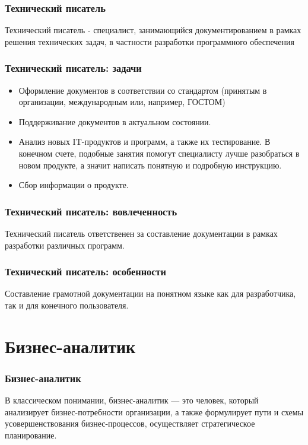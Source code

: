 \documentclass{../industrial-development}
\begin{document}
	\begin{frame} \frametitle{Технический писатель}
		\begin{block}{}
			\alert {Технический писатель} - специалист, занимающийся документированием в рамках решения технических задач, в частности разработки программного обеспечения
		\end{block}
	\end{frame}
	
	\begin{frame} \frametitle{Технический писатель: задачи}
		\begin{itemize}
			\item Оформление документов в соответствии со стандартом (принятым в организации, международным или, например, ГОСТОМ)
			\item Поддерживание документов в актуальном состоянии.
			\item Анализ новых IT-продуктов и программ, а также их тестирование. В конечном счете, подобные занятия помогут специалисту лучше разобраться в новом продукте, а значит написать понятную и подробную инструкцию.
			\item Сбор информации о продукте.
		\end{itemize}
	\end{frame}
	\begin{frame} \frametitle{Технический писатель: вовлеченность}
		Технический писатель ответственен за составление документации в рамках разработки различных программ.
	\end{frame}
	
	\begin{frame} \frametitle{Технический писатель: особенности}
		Составление грамотной документации на понятном языке как для разработчика, так и для конечного пользователя.
	\end{frame}
	
	\section{Бизнес-аналитик}
	
	\begin{frame} \frametitle{Бизнес-аналитик}
		\begin{block}{}
			\alert {}В классическом понимании, {бизнес-аналитик} — это человек, который анализирует бизнес-потребности организации, а также формулирует пути и схемы усовершенствования бизнес-процессов, осуществляет стратегическое планирование. 
		\end{block}
		
	\end{frame}
	
\end{document}
